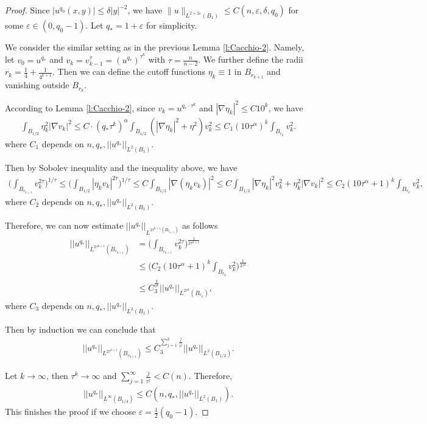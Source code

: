 \documentclass[11pt,reqno]{amsart}
\numberwithin{equation}{section}
\theoremstyle{definition}
\theoremstyle{remark}
\begin{document}
\begin{proof}
Since $|u^{q_0}(x,y) | \leqslant \delta |y|^{-2}$, we have $\|u\|_{L^{2+2\varepsilon}(B_1)} \leqslant C(n,\varepsilon,\delta,q_0)$ for some $\varepsilon \in (0,q_0-1)$. Let $q_* = 1+\varepsilon$ for simplicity.

    We consider the similar setting as in the previous Lemma \ref{l:Cacchio-2}. Namely, let $v_0 = u^{q_*}$ and $v_k = v_{k-1}^{\tau} = (u^{q_*})^{\tau^k}$ with $ \tau =\frac{n}{n-2}$. We further define the radii $r_k = \frac14  +\frac1{4^{k+1}}$. Then we can define the cutoff functions $\eta_k \equiv 1$ in $B_{r_{k+1}}$ and vanishing outside $B_{r_{k}}$.
    
According to Lemma \ref{l:Cacchio-2}, since $v_k = u^{q_*\cdot \tau^k}$ and $|\nabla \eta_k|^2 \leqslant C 10^k$, we have
    \begin{align}
        \int_{B_{1/2}} \eta_k^2 |\nabla v_k|^2 \leqslant C \cdot(q_* \tau^k)^{\alpha}\int_{B_{1/2}} (|\nabla \eta_k|^2 + \eta^2) v_k^2 \leqslant C_1  (10\tau^{\alpha})^k \int_{B_{r_k}} v_k^2.
    \end{align}
where $C_1$ depends on $n, q_*, ||u^{q_*}||_{L^{2}(B_1)}$.

Then by Sobolev inequality and the inequality above, we have
    \begin{align}
        \Big(\int_{B_{r_{k+1}}} v_k^{2\tau} \Big)^{1/\tau} \leqslant \Big( \int_{B_{1/2}} |\eta_k v_k|^{2\tau} \Big)^{1/\tau} \leqslant C \int_{B_{1/2}} |\nabla(\eta_k v_k)|^2 \leqslant C \int_{B_{1/2}} |\nabla\eta_k|^2v_k^2 + \eta_k^2 |\nabla v_k|^2 \leqslant C_2 (10 \tau^{\alpha}+1)^k \int_{B_{r_{k}}} v_k^2,
    \end{align}
where $C_2$ depends on $n, q_*, ||u^{q_*}||_{L^{2}(B_1)}$.

Therefore, we can now estimate $||u^{q_*}||_{L^{2\tau^{k+1}(B_{r_{k+1}})}}$ as follows
\begin{align}
    ||u^{q_*}||_{L^{2\tau^{k+1}}(B_{r_{k+1}})} &= \Big(\int_{B_{r_{k+1}}} v_k^{2\tau} \Big)^{\frac1{2\tau^{k+1}}} \\
    &\leqslant \Big( C_2 (10 \tau^{\alpha}+1)^k \int_{B_{r_{k}}} v_k^2 \Big)^{\frac1{2\tau^k}} \\
    &\leqslant C_3^{\frac{k}{\tau^k}} ||u^{q_*}||_{L^{2\tau^k}(B_{r_{k}})},
\end{align}
where $C_3$ depends on $n,q_*,||u^{q_*}||_{L^2(B_1)}$.

Then by induction we can conclude that
\begin{align}
    ||u^{q_*}||_{L^{2\tau^{k+1}}(B_{r_{k+1}})} \leqslant C_3^{\sum_{j=1}^k \frac{j}{\tau^j}} ||u^{q_*}||_{L^2(B_{1/2})}.
\end{align}

Let $k \to \infty$, then $\tau^k \to \infty$ and $\sum_{j=1}^{\infty} \frac{j}{\tau^j} < C(n)$. Therefore,
\begin{align}
    ||u^{q_*}||_{L^{\infty}(B_{1/4})} \leqslant C(n,q_*,||u^{q_*}||_{L^2(B_1)}).
\end{align}
    This finishes the proof if we choose $\varepsilon = \frac1{2}(q_0-1)$.
\end{proof}
\end{document}
